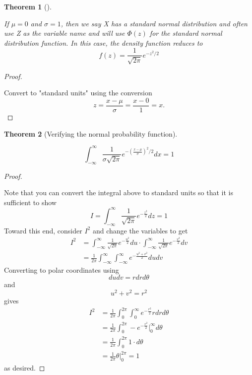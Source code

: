 \documentclass[10pt,]{book}
\theoremstyle{plain}
\newtheorem{theorem}{Theorem}[section]
\theoremstyle{definition}
\theoremstyle{definition}
\theoremstyle{definition}
\numberwithin{equation}{section}
\begin{document}
	\begin{theorem}[{}]\label{theorem-54}

If \(\mu = 0\) and \(\sigma = 1\), then we say X has a standard normal distribution and often use Z as the variable name and will use \(\Phi(z)\) for the standard normal distribution function. In this case, the density function reduces to
		\begin{equation*}f(z) = \frac{1}{\sqrt{2 \pi}} e^{ -z^2 / 2}\end{equation*}
\end{theorem}
\begin{proof}\hypertarget{proof-53}{}
Convert to "standard units" using the conversion 
			\begin{equation*}z = \frac{x-\mu}{\sigma} = \frac{x-0}{1} = x.\end{equation*}
\end{proof}


	\begin{theorem}[{Verifying the normal probability function}]\label{theorem-55}

		\begin{equation*}\int_{-\infty}^{\infty} \frac{1}{\sigma \sqrt{2 \pi}} e^{ -\left ( \frac{x-\mu}{\sigma} \right ) ^2 / 2} dx = 1\end{equation*}
\end{theorem}
\begin{proof}\hypertarget{proof-54}{}
Note that you can convert the integral above to standard units so that it is sufficient to show
\begin{equation*}I = \int_{-\infty}^{\infty} \frac{1}{\sqrt{2 \pi}} e^{ -\frac{z^2}{2} } dz = 1\end{equation*}
Toward this end, consider \(I^2\) and change the variables to get
\begin{align*}
I^2 & = \int_{-\infty}^{\infty} \frac{1}{\sqrt{2 \pi}} e^{ -\frac{u^2}{2} } du \cdot \int_{-\infty}^{\infty} \frac{1}{\sqrt{2 \pi}} e^{ -\frac{v^2}{2} } dv\\
& = \frac{1}{2 \pi} \int_{-\infty}^{\infty} \int_{-\infty}^{\infty} e^{ -\frac{u^2+v^2}{2} } du dv
\end{align*}
Converting to polar coordinates using 
\begin{equation*} du dv = r dr d\theta \end{equation*} and
\begin{equation*} u^2 + v^2 = r^2\end{equation*}
gives
\begin{align*}
I^2 & = \frac{1}{2 \pi} \int_0^{2 \pi} \int_0^{\infty} e^{ -\frac{r^2}{2} } r dr d\theta\\
 & = \frac{1}{2 \pi} \int_0^{2 \pi} -e^{ -\frac{r^2}{2} } \big |_0^{\infty} d\theta\\
 & = \frac{1}{2 \pi} \int_0^{2 \pi} 1 \cdot d\theta\\
 & = \frac{1}{2 \pi} \theta \big |_0^{2 \pi} = 1
\end{align*}
as desired.
%
\end{proof}
\end{document}
